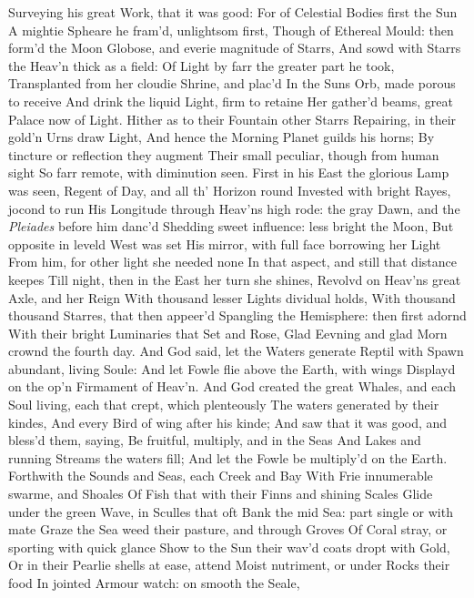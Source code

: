 \documentclass[11pt]{book}
\newcounter {first}
\begin{document}
Surveying his great Work, that it was good: 
For of Celestial Bodies first the Sun 
A mightie Spheare he fram'd, unlightsom first, 
Though of Ethereal Mould: then form'd the Moon 
Globose, and everie magnitude of Starrs, 
And sowd with Starrs the Heav'n thick as a field: 
Of Light by farr the greater part he took, 
Transplanted from her cloudie Shrine, and plac'd 
In the Suns Orb, made porous to receive 
And drink the liquid Light, firm to retaine 
Her gather'd beams, great Palace now of Light. 
Hither as to their Fountain other Starrs 
Repairing, in their gold'n Urns draw Light, 
And hence the Morning Planet guilds his horns; 
By tincture or reflection they augment 
Their small peculiar, though from human sight 
So farr remote, with diminution seen. 
First in his East the glorious Lamp was seen, 
Regent of Day, and all th' Horizon round 
Invested with bright Rayes, jocond to run 
His Longitude through Heav'ns high rode: the gray 
Dawn, and the \textit{Pleiades} before him danc'd 
Shedding sweet influence: less bright the Moon, 
But opposite in leveld West was set 
His mirror, with full face borrowing her Light 
From him, for other light she needed none 
In that aspect, and still that distance keepes 
Till night, then in the East her turn she shines, 
Revolvd on Heav'ns great Axle, and her Reign 
With thousand lesser Lights dividual holds, 
With thousand thousand Starres, that then appeer'd 
Spangling the Hemisphere: then first adornd 
With their bright Luminaries that Set and Rose, 
Glad Eevning and glad Morn crownd the fourth day. 
\quad And God said, let the Waters generate 
Reptil with Spawn abundant, living Soule: 
And let Fowle flie above the Earth, with wings 
Displayd on the op'n Firmament of Heav'n. 
And God created the great Whales, and each 
Soul living, each that crept, which plenteously 
The waters generated by their kindes, 
And every Bird of wing after his kinde; 
And saw that it was good, and bless'd them, saying, 
Be fruitful, multiply, and in the Seas 
And Lakes and running Streams the waters fill; 
And let the Fowle be multiply'd on the Earth. 
Forthwith the Sounds and Seas, each Creek and Bay 
With Frie innumerable swarme, and Shoales 
Of Fish that with their Finns and shining Scales 
Glide under the green Wave, in Sculles that oft 
Bank the mid Sea: part single or with mate 
Graze the Sea weed their pasture, and through Groves 
Of Coral stray, or sporting with quick glance 
Show to the Sun their wav'd coats dropt with Gold, 
Or in their Pearlie shells at ease, attend 
Moist nutriment, or under Rocks their food 
In jointed Armour watch: on smooth the Seale, 
\end{document}
